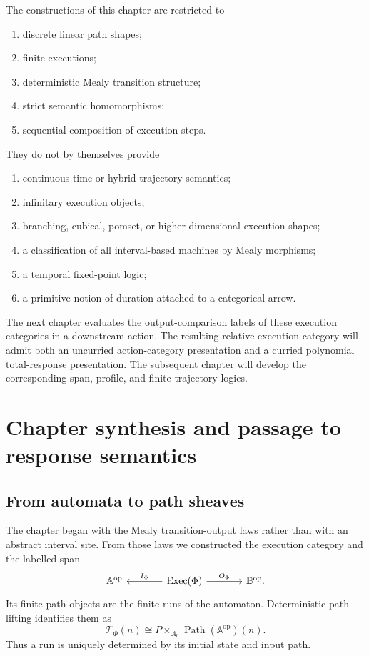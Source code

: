 The constructions of this chapter are restricted to
\begin{enumerate}
    \item discrete linear path shapes;
    \item finite executions;
    \item deterministic Mealy transition structure;
    \item strict semantic homomorphisms;
    \item sequential composition of execution steps.
\end{enumerate}
They do not by themselves provide
\begin{enumerate}
    \item continuous-time or hybrid trajectory semantics;
    \item infinitary execution objects;
    \item branching, cubical, pomset, or higher-dimensional execution shapes;
    \item a classification of all interval-based machines by Mealy morphisms;
    \item a temporal fixed-point logic;
    \item a primitive notion of duration attached to a categorical arrow.
\end{enumerate}

The next chapter evaluates the output-comparison labels of these execution
categories in a downstream action.  The resulting relative execution category
will admit both an uncurried action-category presentation and a curried
polynomial total-response presentation.  The subsequent chapter will develop
the corresponding span, profile, and finite-trajectory logics.

\section{Chapter synthesis and passage to response semantics}
\label{sec:temporal-trajectories-chapter-synthesis}

\subsection{From automata to path sheaves}
\label{subsec:temporal-classification-summary}

The chapter began with the Mealy transition-output laws rather than with an
abstract interval site. From those laws we constructed the execution category
and the labelled span
\[
\begin{tikzcd}[column sep=large]
    \mathbb A^{\mathrm{op}}
    &
    \operatorname{Exec}(\Phi)
        \arrow[l, "I_\Phi"']
        \arrow[r, "O_\Phi"]
    &
    \mathbb B^{\mathrm{op}}.
\end{tikzcd}
\]
Its finite path objects are the finite runs of the automaton. Deterministic
path lifting identifies them as
\[
    \mathscr T_\Phi(n)
    \cong
    P\times_{A_0}
    \operatorname{Path}(\mathbb A^{\mathrm{op}})(n).
\]
Thus a run is uniquely determined by its initial state and input path.

